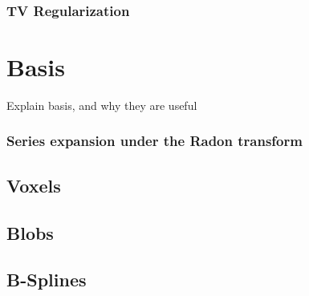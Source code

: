 \subsection{TV Regularization}

\chapter{Basis}

Explain basis, and why they are useful

\subsection{Series expansion under the Radon transform}


\section{Voxels}

\section{Blobs}


\section{B-Splines}
